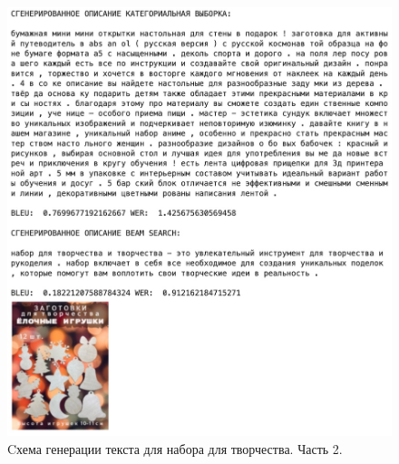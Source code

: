 \documentclass[a4paper,12pt]{extarticle}
\begin{document}
\newpage
\begin{figure}[ht]
	\centering
	\includegraphics[scale=0.4]{test-rnn-art-2.png}
	\caption{Cхема генерации текста для набора для творчества. Часть 2.}
	\label{fig:test-rnn-art-2}
\end{figure}
\end{document}
